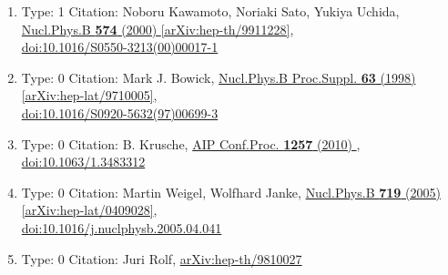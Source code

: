 \documentclass[a4paper,10pt]{article}
\begin{document}
\begin{enumerate}
\begin{enumerate}
  \item Type: 1 Citation: Noboru Kawamoto, Noriaki Sato, Yukiya Uchida, \href{https://www.doi.org/10.1016/S0550-3213(00)00017-1}{Nucl.Phys.B {\bf 574} (2000) }  \href{https://arxiv.org/abs/hep-th/9911228}{[arXiv:hep-th/9911228]},\\\href{https://www.doi.org/10.1016/S0550-3213(00)00017-1}{doi:10.1016/S0550-3213(00)00017-1}
  \item Type: 0 Citation: Mark J. Bowick, \href{https://www.doi.org/10.1016/S0920-5632(97)00699-3}{Nucl.Phys.B Proc.Suppl. {\bf 63} (1998) }  \href{https://arxiv.org/abs/hep-lat/9710005}{[arXiv:hep-lat/9710005]},\\\href{https://www.doi.org/10.1016/S0920-5632(97)00699-3}{doi:10.1016/S0920-5632(97)00699-3}
  \item Type: 0 Citation: B. Krusche, \href{https://www.doi.org/10.1063/1.3483312}{AIP Conf.Proc. {\bf 1257} (2010) },\\\href{https://www.doi.org/10.1063/1.3483312}{doi:10.1063/1.3483312}
  \item Type: 0 Citation: Martin Weigel, Wolfhard Janke, \href{https://www.doi.org/10.1016/j.nuclphysb.2005.04.041}{Nucl.Phys.B {\bf 719} (2005) }  \href{https://arxiv.org/abs/hep-lat/0409028}{[arXiv:hep-lat/0409028]},\\\href{https://www.doi.org/10.1016/j.nuclphysb.2005.04.041}{doi:10.1016/j.nuclphysb.2005.04.041}
  \item Type: 0 Citation: Juri Rolf, \href{https://arxiv.org/abs/hep-th/9810027}{arXiv:hep-th/9810027}

\end{enumerate}
\end{enumerate}
\end{document}
